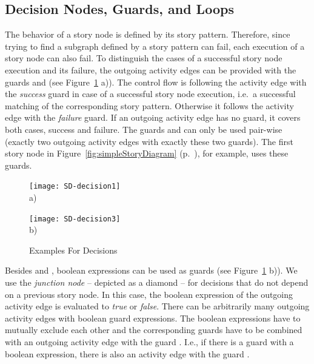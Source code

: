\subsection{Decision Nodes, Guards, and Loops}
\label{sec:DecisionNodesEtc}

The behavior of a story node is defined by its story pattern.
Therefore,
since trying to find a subgraph defined by a story pattern can fail,
each execution of a story node can also fail.
To distinguish the cases of a successful story node execution and its failure,
the outgoing activity edges can be provided with the guards  and  (see Figure~\ref{fig:SD-decisions} a)).
The control flow is following the activity edge with the \emph{success} guard in case of a successful story node execution,
i.e.\ a successful matching of the corresponding story pattern.
Otherwise it follows the activity edge with the \emph{failure} guard.
If an outgoing activity edge has no guard, it covers both cases, success and failure.
The guards  and  can only be used pair-wise (exactly two outgoing activity edges with exactly these two guards).
The first story node in Figure~\ref{fig:simpleStoryDiagram} (p.~\pageref{fig:simpleStoryDiagram}), for example, uses these guards.

\begin{figure}[htb]
	\centering
  \begin{minipage}[t]{.5\textwidth}
    \centering
    \texttt{[image: SD-decision1]}
    \\a)
  \end{minipage}%
  \hfill
  \begin{minipage}[t]{.5\textwidth}
    \centering
    \texttt{[image: SD-decision3]}
    \\b)
  \end{minipage}
  \caption{Examples For Decisions}
  \label{fig:SD-decisions}
\end{figure}

Besides  and , boolean expressions can be used as guards (see Figure~\ref{fig:SD-decisions} b)).
We use the \emph{junction node} -- depicted as a diamond -- for decisions that do not depend on a previous story node.
In this case, the boolean expression of the outgoing activity edge is evaluated to \emph{true} or \emph{false}.
There can be arbitrarily many outgoing activity edges with boolean guard expressions.
The boolean expressions have to mutually exclude each other
and the corresponding guards have to be combined with an outgoing activity edge with the guard .
I.e., if there is a guard with a boolean expression, there is also an activity edge with the guard .

